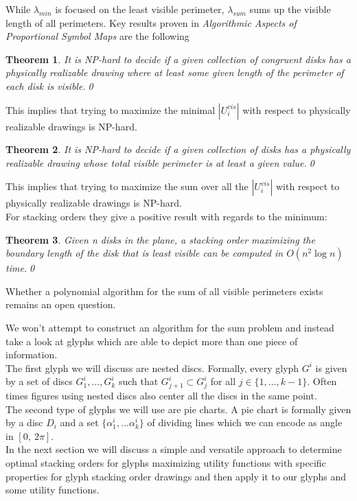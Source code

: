 \documentclass[a4paper,11pt]{article}
\newtheorem{theorem}{Theorem}
\begin{document}
While $\lambda_{min}$ is focused on the least visible perimeter, $\lambda_{sum}$ sums up the visible length of all perimeters. Key results proven in \textit{Algorithmic Aspects of Proportional Symbol Maps} are the following
\begin{theorem}
  It is NP-hard to decide if a given collection of congruent disks has a
  physically realizable drawing where at least some given length of the perimeter of
  each disk is visible.\qed
\end{theorem}
This implies that trying to maximize the minimal $|U_i^{vis}|$ with respect to physically realizable drawings is NP-hard.
\begin{theorem}
  It is NP-hard to decide if a given collection of disks has a physically
  realizable drawing whose total visible perimeter is at least a given value.\qed
\end{theorem}
This implies that trying to maximize the sum over all the $|U_i^{vis}|$ with respect to physically realizable drawings is NP-hard.\\
For stacking orders they give a positive result with regards to the minimum:
\begin{theorem}
  Given n disks in the plane, a stacking order maximizing the boundary
  length of the disk that is least visible can be computed in $O(n^2 \log n)$ time.\qed
\end{theorem}
Whether a polynomial algorithm for the sum of all visible perimeters exists remains an open question.\\


\newpage

We won't attempt to construct an algorithm for the sum problem and instead take a look at glyphs which are able to depict more than one piece of information.\\
The first glyph we will discuss are nested discs. Formally, every glyph $G^i$ is given by a set of discs $G^i_1,...,G^i_k$ such that $G^i_{j+1}\subset G^i_j$ for all $j\in \{1,...,k-1 \}$. Often times figures using nested discs also center all the discs in the same point.\\
The second type of glyphs we will use are pie charts. A pie chart is formally given by a disc $D_i$ and a set $\{\alpha_1^i,...\alpha_k^i\}$ of dividing lines which we can encode as angle in $[0,\ 2\pi]$.\\

In the next section we will discuss a simple and versatile approach to determine optimal stacking orders for glyphs maximizing utility functions with specific properties for glyph stacking order drawings and then apply it to our glyphs and some utility functions.
\end{document}
